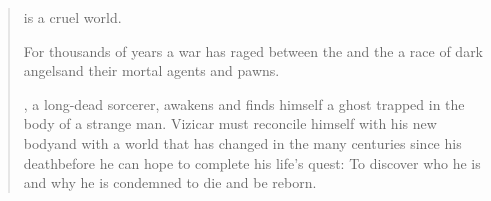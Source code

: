 \begin{quote}
  \Miith{} is a cruel world. 
  
  \new
  For thousands of years a war has raged between the \dragons{} and the \resphain\dash a race of dark angels\dash and their mortal agents and pawns. 
  
  \new
  \VizicarDurasRespina, a long-dead sorcerer, awakens and finds himself a ghost trapped in the body of a strange man. 
  Vizicar must reconcile himself with his new body\dash and with a world that has changed in the many centuries since his death\dash before he can hope to complete his life's quest: 
  To discover who he is and why he is condemned to die and be reborn. 
\end{quote}



